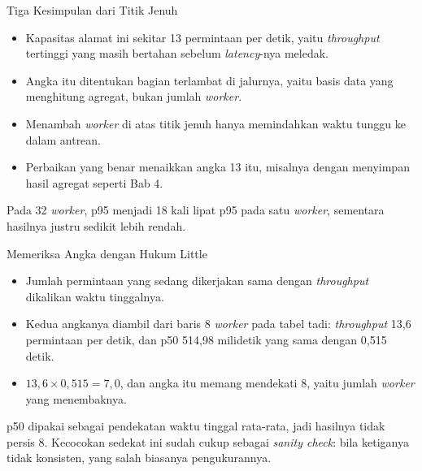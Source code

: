\documentclass[aspectratio=169, table, 12pt]{beamer}
\begin{document}
\begin{frame}{{\Large Tiga Kesimpulan dari Titik Jenuh}}
  \vspace{10pt}
  \begin{itemize}
    \item Kapasitas alamat ini sekitar 13 permintaan per detik, yaitu
          \textit{throughput} tertinggi yang masih bertahan sebelum
          \textit{latency}-nya meledak.
    \item Angka itu ditentukan bagian terlambat di jalurnya, yaitu basis data
          yang menghitung agregat, bukan jumlah \textit{worker}.
    \item Menambah \textit{worker} di atas titik jenuh hanya memindahkan
          waktu tunggu ke dalam antrean.
    \item Perbaikan yang benar menaikkan angka 13 itu, misalnya dengan
          menyimpan hasil agregat seperti Bab 4.
  \end{itemize}
  \vspace{6pt}
  {\footnotesize Pada 32 \textit{worker}, p95 menjadi 18 kali lipat p95 pada
  satu \textit{worker}, sementara hasilnya justru sedikit lebih rendah.}
\end{frame}

\begin{frame}{{\Large Memeriksa Angka dengan Hukum Little}}
  \vspace{14pt}
  \begin{itemize}
    \item Jumlah permintaan yang sedang dikerjakan sama dengan
          \textit{throughput} dikalikan waktu tinggalnya.
    \item Kedua angkanya diambil dari baris 8 \textit{worker} pada tabel tadi:
          \textit{throughput} 13,6 permintaan per detik, dan p50 514,98
          milidetik yang sama dengan 0,515 detik.
    \item $13{,}6 \times 0{,}515 = 7{,}0$, dan angka itu memang mendekati 8,
          yaitu jumlah \textit{worker} yang menembaknya.
  \end{itemize}
  \vspace{6pt}
  {\footnotesize p50 dipakai sebagai pendekatan waktu tinggal rata-rata, jadi
  hasilnya tidak persis 8. Kecocokan sedekat ini sudah cukup sebagai
  \textit{sanity check}: bila ketiganya tidak konsisten, yang salah biasanya
  pengukurannya.}
\end{frame}
\end{document}
